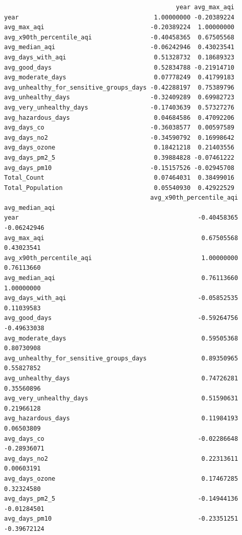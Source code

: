 \documentclass[
  12pt,
]{article}
\begin{document}
\begin{verbatim}
                                               year avg_max_aqi
year                                     1.00000000 -0.20389224
avg_max_aqi                             -0.20389224  1.00000000
avg_x90th_percentile_aqi                -0.40458365  0.67505568
avg_median_aqi                          -0.06242946  0.43023541
avg_days_with_aqi                        0.51328732  0.18689323
avg_good_days                            0.52834788 -0.21914710
avg_moderate_days                        0.07778249  0.41799183
avg_unhealthy_for_sensitive_groups_days -0.42288197  0.75389796
avg_unhealthy_days                      -0.32409289  0.69982723
avg_very_unhealthy_days                 -0.17403639  0.57327276
avg_hazardous_days                       0.04684586  0.47092206
avg_days_co                             -0.36038577  0.00597589
avg_days_no2                            -0.34590792  0.16998642
avg_days_ozone                           0.18421218  0.21403556
avg_days_pm2_5                           0.39884828 -0.07461222
avg_days_pm10                           -0.15157526 -0.02945708
Total_Count                              0.07464031  0.38499016
Total_Population                         0.05540930  0.42922529
                                        avg_x90th_percentile_aqi avg_median_aqi
year                                                 -0.40458365    -0.06242946
avg_max_aqi                                           0.67505568     0.43023541
avg_x90th_percentile_aqi                              1.00000000     0.76113660
avg_median_aqi                                        0.76113660     1.00000000
avg_days_with_aqi                                    -0.05852535     0.11039583
avg_good_days                                        -0.59264756    -0.49633038
avg_moderate_days                                     0.59505368     0.80730908
avg_unhealthy_for_sensitive_groups_days               0.89350965     0.55827852
avg_unhealthy_days                                    0.74726281     0.35560896
avg_very_unhealthy_days                               0.51590631     0.21966128
avg_hazardous_days                                    0.11984193     0.06503809
avg_days_co                                          -0.02286648    -0.28936071
avg_days_no2                                          0.22313611     0.00603191
avg_days_ozone                                        0.17467285     0.32324580
avg_days_pm2_5                                       -0.14944136    -0.01284501
avg_days_pm10                                        -0.23351251    -0.39672124

\end{verbatim}
\end{document}
